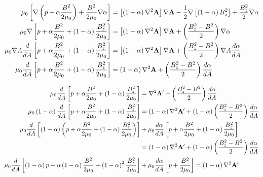 \[
\begin{split}
    \mu_0\left[ \nabla\left( p + \alpha\frac{B^2}{2\mu_0} \right) + \frac{B^2}{2\mu_0}\nabla\alpha \right]  &= \left[ \left( 1-\alpha \right)\nabla^2\mathbf{A} \right] \nabla\mathbf{A} - \frac{1}{2}\nabla\left[ \left( 1-\alpha \right)B_z^2 \right] + \frac{B_z^2}{2}\nabla\alpha \\
    \mu_0\nabla\left[ p + \alpha\frac{B^2}{2\mu_0} + \left( 1-\alpha \right)\frac{B_z^2}{2\mu_0} \right] &= \left[ \left( 1-\alpha \right)\nabla^2\mathbf{A} \right]\nabla\mathbf{A} + \left( \frac{B_z^2-B^2}{2} \right)\nabla\alpha \\
    \mu_0\nabla A\frac{d}{dA}\left[ p + \alpha\frac{B^2}{2\mu_0} + \left( 1-\alpha \right)\frac{B_z^2}{2\mu_0} \right] &= \left[ \left( 1-\alpha \right)\nabla^2\mathbf{A} \right]\nabla\mathbf{A} + \left( \frac{B_z^2-B^2}{2} \right)\nabla A \frac{d\alpha}{d A} \\
    \mu_0\frac{d}{d A}\left[ p + \alpha\frac{B^2}{2\mu_0} + \left( 1-\alpha \right)\frac{B_z^2}{2\mu_0} \right] &= \left( 1-\alpha \right)\nabla^2\mathbf{A} + \left( \frac{B_z^2-B^2}{2} \right)\frac{d\alpha}{dA} \\
\end{split}
\]

\[\begin{split}
    \mu_0\frac{d}{d A}\left[ p + \alpha\frac{B^2}{2\mu_0} + \left( 1-\alpha \right)\frac{B_z^2}{2\mu_0} \right] &= \nabla^2\mathbf{A}' + \left( \frac{B_z^2-B^2}{2} \right)\frac{d\alpha}{dA} \\
    \mu_0\left( 1-\alpha \right)\frac{d}{d A}\left[ p + \alpha\frac{B^2}{2\mu_0} + \left( 1-\alpha \right)\frac{B_z^2}{2\mu_0} \right] &= \left( 1-\alpha \right)\nabla^2\mathbf{A}' + \left( 1-\alpha \right)\left( \frac{B_z^2-B^2}{2} \right)\frac{d\alpha}{dA} \\
    \mu_0\frac{d}{d A}\left[ \left( 1-\alpha \right)\left( p + \alpha\frac{B^2}{2\mu_0} + \left( 1-\alpha \right)\frac{B_z^2}{2\mu_0} \right) \right] &+ \mu_0\frac{d\alpha}{dA}\left[ p + \alpha\frac{B^2}{2\mu_0} + \left( 1-\alpha \right)\frac{B_z^2}{2\mu_0} \right] \\
    &= \left( 1-\alpha \right)\nabla^2\mathbf{A}' + \left( 1-\alpha \right)\left( \frac{B_z^2-B^2}{2} \right)\frac{d\alpha}{dA} \\
    \mu_0\frac{d}{d A}\left[ \left( 1-\alpha \right)p + \alpha\left( 1-\alpha \right)\frac{B^2}{2\mu_0} + \left( 1-\alpha \right)^2\frac{B_z^2}{2\mu_0} \right] &+ \mu_0\frac{d\alpha}{dA}\left[ p + \frac{B^2}{2\mu_0} \right] = \left( 1-\alpha \right)\nabla^2\mathbf{A}'\\
\end{split}
\]



